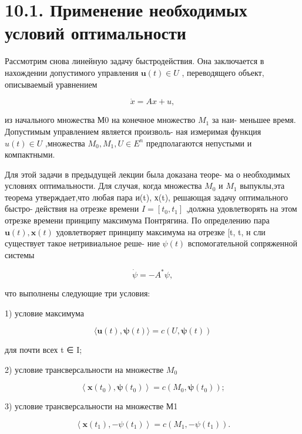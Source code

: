 \documentclass[8pt]{extarticle}
\begin{document}
\section*{10.1. Применение необходимых условий оптимальности}

Рассмотрим снова линейную задачу быстродействия. Она заключается в нахождении допустимого управления \(\mathbf{u}\left( t\right)  \in  U\) , переводящего объект, описываемый уравнением

\[
\dot{x} = {Ax} + u, \tag{10.1}
\]

из начального множества М0 на конечное множество \({M}_{1}\) за наи- меньшее время. Допустимым управлением является произволь- ная измеримая функция \(u\left( t\right)  \in  U\) ,множества \({M}_{0},{M}_{1},U \in  {E}^{n}\) предполагаются непустыми и компактными.

Для этой задачи в предыдущей лекции была доказана теоре- ма о необходимых условиях оптимальности. Для случая, когда множества \({M}_{0}\) и \({M}_{1}\) выпуклы,эта теорема утверждает,что любая пара и(t), х(t), решающая задачу оптимального быстро- действия на отрезке времени \(I = \left\lbrack  {{t}_{0},{t}_{1}}\right\rbrack\) ,должна удовлетворять на этом отрезке времени принципу максимума Понтрягина. По определению пара \(\mathbf{u}\left( t\right) ,\mathbf{x}\left( t\right)\) удовлетворяет принципу максимума на отрезке [t, t, н сли существует такое нетривиальное реше- ние \(\psi \left( t\right)\) вспомогательной сопряженной системы

\[
\dot{\psi } =  - {A}^{ * }\psi , \tag{10.2}
\]

что выполнены следующие три условия:

1) условие максимума

\[
\langle \mathbf{u}\left( t\right) ,\mathbf{\psi }\left( t\right) \rangle  = c\left( {U,\mathbf{\psi }\left( t\right) }\right) \tag{10.3}
\]

для почти всех t ∈ I;

2) условие трансверсальности на множестве \({M}_{0}\)

\[
\left\langle  {\mathbf{x}\left( {t}_{0}\right) ,\mathbf{\psi }\left( {t}_{0}\right) }\right\rangle   = c\left( {{M}_{0},\mathbf{\psi }\left( {t}_{0}\right) }\right) ; \tag{10.4}
\]

3) условие трансверсальности на множестве М1

\[
\left\langle  {\mathbf{x}\left( {t}_{1}\right) , - \psi \left( {t}_{1}\right) }\right\rangle   = c\left( {{M}_{1}, - \psi \left( {t}_{1}\right) }\right) . \tag{10.5}
\]
\end{document}

